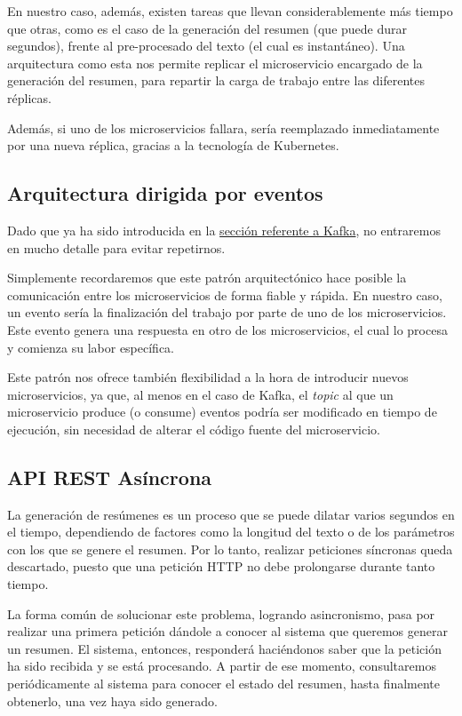 En nuestro caso, además, existen tareas que llevan considerablemente más tiempo que otras, como es el caso de la generación del resumen (que puede durar segundos), frente al pre-procesado del texto (el cual es instantáneo). Una arquitectura como esta nos permite replicar el microservicio encargado de la generación del resumen, para repartir la carga de trabajo entre las diferentes réplicas.

Además, si uno de los microservicios fallara, sería reemplazado inmediatamente por una nueva réplica, gracias a la tecnología de Kubernetes.

\subsection{Arquitectura dirigida por eventos}

Dado que ya ha sido introducida en la \hyperref[subsec:kafka]{sección referente a Kafka}, no entraremos en mucho detalle para evitar repetirnos.

Simplemente recordaremos que este patrón arquitectónico hace posible la comunicación entre los microservicios de forma fiable y rápida. En nuestro caso, un evento sería la finalización del trabajo por parte de uno de los microservicios. Este evento genera una respuesta en otro de los microservicios, el cual lo procesa y comienza su labor específica.

Este patrón nos ofrece también flexibilidad a la hora de introducir nuevos microservicios, ya que, al menos en el caso de Kafka, el \emph{topic} al que un microservicio produce (o consume) eventos podría ser modificado en tiempo de ejecución, sin necesidad de alterar el código fuente del microservicio.

\subsection{API REST Asíncrona}

La generación de resúmenes es un proceso que se puede dilatar varios segundos en el tiempo, dependiendo de factores como la longitud del texto o de los parámetros con los que se genere el resumen. Por lo tanto, realizar peticiones síncronas queda descartado, puesto que una petición HTTP no debe prolongarse durante tanto tiempo.

La forma común de solucionar este problema, logrando asincronismo, pasa por realizar una primera petición dándole a conocer al sistema que queremos generar un resumen. El sistema, entonces, responderá haciéndonos saber que la petición ha sido recibida y se está procesando. A partir de ese momento, consultaremos periódicamente al sistema para conocer el estado del resumen, hasta finalmente obtenerlo, una vez haya sido generado.

